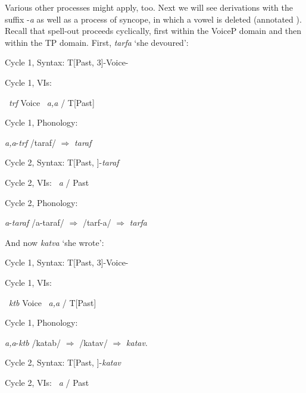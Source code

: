\begin{exe}
\begin{xlist}
\begin{exe}
\begin{xlist}
\begin{exe}
\begin{xlist}
\begin{exe}
\begin{exe}
\begin{xlist}
\begin{exe}
\begin{xlist}
\begin{exe}
\begin{xlist}
\begin{exe}
\begin{xlist}
\begin{exe}
\begin{xlist}
\begin{exe}
\begin{xlist}
\begin{exe}
\begin{xlist}
\begin{exe}
\begin{xlist}
\begin{exe}
\begin{xlist}
\begin{exe}
\begin{xlist}
\begin{exe}
\begin{xlist}
\begin{exe}
\begin{xlist}
\begin{exe}
\begin{xlist}
\begin{exe}
\begin{exe}
\begin{xlist}
\begin{exe}
\begin{xlist}
\begin{exe}
\begin{xlist}
\begin{exe}
\begin{xlist}
\begin{exe}
\begin{xlist}
\begin{exe}
\begin{xlist}
\begin{exe}
\begin{xlist}
Various other processes might apply, too. Next we will see derivations with the  suffix -\emph{a} as well as a process of syncope, in which a vowel is deleted (annotated ). Recall that spell-out proceeds cyclically, first within the VoiceP domain and then within the TP domain. First, \emph{tarfa} `she devoured':
 \begin{exe}
\ex   Cycle 1, Syntax: 
	 T[Past, 3]-Voice-

 \ex  Cycle 1, VIs: 
 \begin{xlist} 
 	\ex   {} \lra~\emph{trf} 
 	\ex   Voice \lra~\emph{a,a} / T[Past] \trace 
 \z

 \ex  Cycle 1, Phonology: 
 \begin{xlist} 
 	\ex   \emph{a,a}-\emph{trf} 
 	\ex   /taraf/ $\Rightarrow$ \emph{taraf} 
 \z

\ex  Cycle 2, Syntax: 
	T[Past, ]-\emph{taraf}

\ex   Cycle 2, VIs: 
	 \lra~\emph{a} / Past \trace

 \ex  Cycle 2, Phonology: 
 \begin{xlist} 
 	\ex   \emph{a}-\emph{taraf} 
 	\ex   /a-taraf/ $\Rightarrow$ /tarf-a/ $\Rightarrow$ \emph{tarfa} 
 \z
\z 

And now \emph{katva} `she wrote':
 \begin{exe}
\ex  Cycle 1, Syntax: 
	T[Past, 3]-Voice-

 \ex  Cycle 1, VIs: 
 \begin{xlist} 
 	\ex  {} \lra~\emph{ktb} 
 	\ex   Voice \lra~\emph{a,a} / T[Past] \trace 
 \z

 \ex  Cycle 1, Phonology: 
 \begin{xlist} 
 	\ex   \emph{a,a}-\emph{ktb} 
 	\ex  	/katab/ $\Rightarrow$ /katav/ $\Rightarrow$ \emph{katav}. 
 \z

\ex   Cycle 2, Syntax: 
	T[Past, ]-\emph{katav}

\ex   Cycle 2, VIs: 
	 \lra~\emph{a} / Past \trace


\end{xlist}
\end{xlist}
\end{exe}
\end{xlist}
\end{xlist}
\end{xlist}
\end{exe}
\end{xlist}
\end{exe}
\end{xlist}
\end{exe}
\end{xlist}
\end{exe}
\end{xlist}
\end{exe}
\end{xlist}
\end{exe}
\end{xlist}
\end{exe}
\end{xlist}
\end{exe}
\end{exe}
\end{xlist}
\end{exe}
\end{xlist}
\end{exe}
\end{xlist}
\end{exe}
\end{xlist}
\end{exe}
\end{xlist}
\end{exe}
\end{xlist}
\end{exe}
\end{xlist}
\end{exe}
\end{xlist}
\end{exe}
\end{xlist}
\end{exe}
\end{xlist}
\end{exe}
\end{xlist}
\end{exe}
\end{xlist}
\end{exe}
\end{xlist}
\end{exe}
\end{exe}
\end{xlist}
\end{exe}
\end{xlist}
\end{exe}
\end{xlist}
\end{exe}
